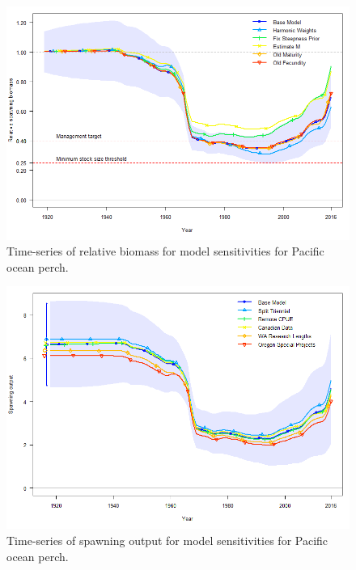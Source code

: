 \documentclass[12pt,]{article}
\begin{document}
\FloatBarrier

\begin{figure}
\centering
\includegraphics{Figures/depl_sens1.png}
\caption{Time-series of relative biomass for model sensitivities for
Pacific ocean perch. \label{fig:sens1_depl}}
\end{figure}

\FloatBarrier

\begin{figure}
\centering
\includegraphics{Figures/ssb_sens2.png}
\caption{Time-series of spawning output for model sensitivities for
Pacific ocean perch. \label{fig:sens2_ssb}}
\end{figure}

\FloatBarrier
\end{document}
